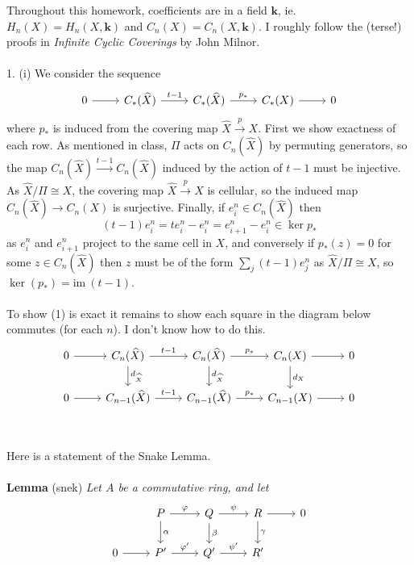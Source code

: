 \documentclass{article}
\newcommand{\im}{\text{im}\:}
\begin{document}
\large 

\vspace{0.05in}

Throughout this homework, coefficients are in a field $\textbf{k}$, ie. $H_n(X) = H_n(X, \textbf{k})$ and $C_n(X) = C_n(X,\textbf{k}).$ I roughly follow the (terse!) proofs in \textit{Infinite Cyclic Coverings} by John Milnor. 
\\ \\
1. (i) We consider the sequence 
\begin{equation}
\begin{tikzcd}
0 \ar[r] &C_*(\widehat{X}) \ar[r, "t-1"] &C_*(\widehat{X}) \ar[r, "p_*"] &C_*(X) \ar[r] &0
\end{tikzcd}
\end{equation}
where $p_*$ is induced from the covering map $\widehat{X} \xrightarrow{p} X$. First we show exactness of each row. As mentioned in class, $\Pi$ acts on $C_n(\widehat{X})$ by permuting generators, so the map $C_n(\widehat{X}) \xrightarrow{t-1} C_n(\widehat{X})$ induced by the action of $t-1$ must be injective. As $\widehat{X}/\Pi \cong X$, the covering map $\widehat{X} \xrightarrow{p} X$ is cellular, so the induced map $C_n(\widehat{X}) \to C_n(X)$ is surjective. Finally, if $e_i^n \in C_n(\widehat{X})$ then 
\[
(t-1)e_i^n = te_i^n - e_i^n = e_{i+1}^n - e_i^n \in \ker p_*
\]
as $e_i^n$ and $e_{i+1}^n$ project to the same cell in $X$, and conversely if $p_*(z) = 0$ for some $z \in C_n(\widehat{X})$ then $z$ must be of the form $\sum_j (t-1)e_j^n$ as $\widehat{X}/\Pi \cong X$, so $\ker(p_*) = \im(t-1)$. \\ \\
To show (1) is exact it remains to show each square in the diagram below commutes (for each $n$). I don't know how to do this.
\[
\begin{tikzcd}
  0 \ar[r] &C_n(\widehat{X}) \ar[d, "d_{\widehat{X}}"] \ar[r, "t-1"] &C_n(\widehat{X}) \ar[d, "d_{\widehat{X}}"] \ar[r, "p_*"] &C_n(X) \ar[d, "d_X"] \ar[r] &0 \\
  0 \ar[r] &C_{n-1}(\widehat{X}) \ar[r, "t-1"] &C_{n-1}(\widehat{X}) \ar[r, "p_*"] &C_{n-1}(X) \ar[r] &0
\end{tikzcd}
\]
\\ \\
Here is a statement of the Snake Lemma. \\ \\
\textbf{Lemma} (snek) \textit{Let $A$ be a commutative ring, and let} 
\begin{equation}
\begin{tikzcd}
&P \ar[d, "\alpha"] \ar[r, "\varphi"] &Q \ar[r, "\psi"] \ar[d, "\beta"] &R \ar[d, "\gamma"] \ar[r] &0 \\
0 \ar[r] &P' \ar[r, "\varphi'"] &Q' \ar[r, "\psi'"] &R'
\end{tikzcd}
\end{equation}
\end{document}
